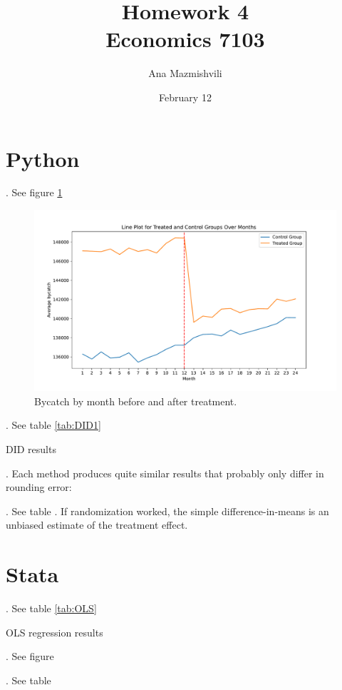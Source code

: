 \documentclass{article}
\title{Homework 4 \\ Economics 7103}
\author{Ana Mazmishvili}
\date{February 12}
\begin{document}
  
\maketitle

\section{Python}

. See figure \ref{fig:trend}

\begin{figure}[h]
    \centering
    \includegraphics{homework 4/output/figure/trend1.pdf}
    \caption{ Bycatch by month before and after treatment. }
    \label{fig:trend}
\end{figure}

. See table \ref{tab:DID1}

\begin{table}[]
    \centering
    
    \caption{DID results}
    \label{tab:DID1}
\end{table}


. Each method produces quite similar results that probably only differ in rounding error:

. See table .  If randomization worked, the simple difference-in-means is an unbiased estimate of the treatment effect.
\section{Stata}

. See table \ref{tab:OLS}

\begin{table}[]
    \centering
    
    \caption{OLS regression results}
    \label{tab:OLS}
\end{table}



. See figure 



. See table 
\end{document}
